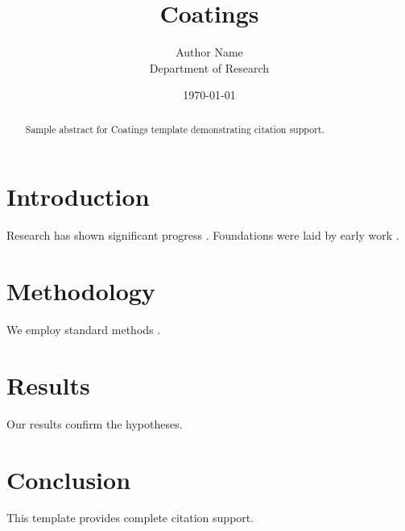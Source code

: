 \documentclass{mdpi}
\title{Coatings}
\author{Author Name \\ \small Department of Research}
\date{\today}
\begin{document}
\maketitle

\begin{abstract}
Sample abstract for Coatings template demonstrating citation support.
\end{abstract}

\section{Introduction}
Research has shown significant progress \citep{einstein1905}. Foundations were laid by early work \citep{turing1950}.

\section{Methodology}
We employ standard methods \citep{knuth1984}.

\section{Results}
Our results confirm the hypotheses.

\section{Conclusion}
This template provides complete citation support.



\end{document}
